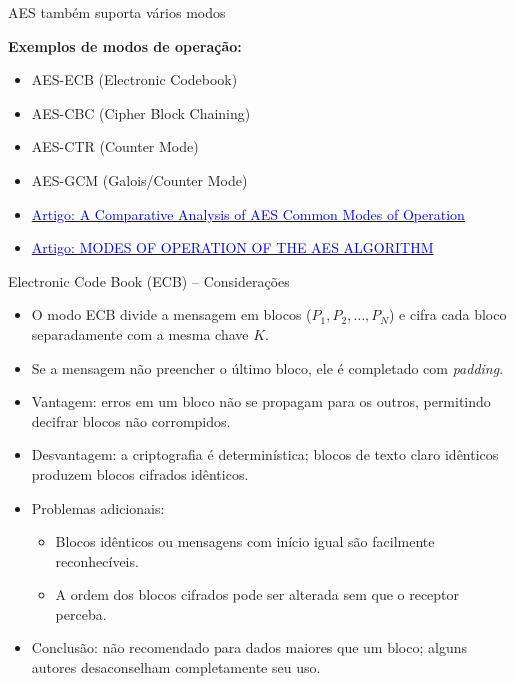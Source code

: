 \begin{frame}{AES também suporta vários modos}

\textbf{Exemplos de modos de operação:}
\begin{itemize}
    \item AES-ECB (Electronic Codebook)
    \item AES-CBC (Cipher Block Chaining)
    \item AES-CTR (Counter Mode)
    \item AES-GCM (Galois/Counter Mode)
    \item \href{https://ieeexplore.ieee.org/stamp/stamp.jsp?arnumber=7946655&casa_token=xII8ag99IPsAAAAA:p362qc3e09WXdTSoT4jOMXCsgCvsdOqc6QuPWiYXum-XcZB1BVzeB9OkdaigwbC5qQYOcDscAw}{\textcolor{blue}{Artigo: A Comparative Analysis of AES Common Modes of Operation}}
    \item \href{https://ciit.finki.ukim.mk/data/papers/10CiiT/10CiiT-46.pdf}{\textcolor{blue}{Artigo: MODES OF OPERATION OF THE AES ALGORITHM}}
\end{itemize}
    
\end{frame}

\begin{frame}{Electronic Code Book (ECB) – Considerações}
    \begin{itemize}
        \item O modo ECB divide a mensagem em blocos ($P_1, P_2, \dots, P_N$) e cifra cada bloco separadamente com a mesma chave $K$.
        \item Se a mensagem não preencher o último bloco, ele é completado com \textit{padding}.
        \item Vantagem: erros em um bloco não se propagam para os outros, permitindo decifrar blocos não corrompidos.
        \item Desvantagem: a criptografia é determinística; blocos de texto claro idênticos produzem blocos cifrados idênticos.
        \item Problemas adicionais:
        \begin{itemize}
            \item Blocos idênticos ou mensagens com início igual são facilmente reconhecíveis.
            \item A ordem dos blocos cifrados pode ser alterada sem que o receptor perceba.
        \end{itemize}
        \item Conclusão: não recomendado para dados maiores que um bloco; alguns autores desaconselham completamente seu uso.
    \end{itemize}
\end{frame}

